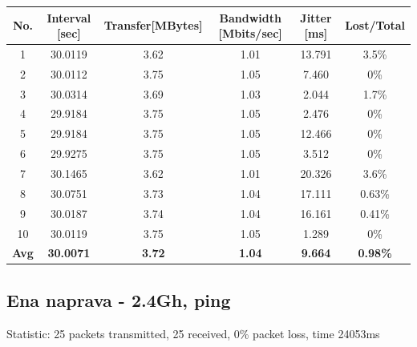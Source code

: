 \documentclass[11pt,a4paper,slovene]{article}
\begin{document}
 \begin{table}[H]
	\begin{adjustwidth}{-3cm}{-3cm}
	\centering
		\begin{tabular}{c|c|c|c|c|c}
		\hline
		\textbf{No.} & \textbf{Interval [sec]} & \textbf{Transfer[MBytes]} & \textbf{Bandwidth [Mbits/sec]} & \textbf{Jitter [ms]} & \textbf{Lost/Total} \\
     		\hline
     		1 & 30.0119 & 3.62 & 1.01 & 13.791 & 3.5\% \\
  		2 & 30.0112 & 3.75 & 1.05 & 7.460 & 0\% \\
  		3 & 30.0314 & 3.69 & 1.03 & 2.044 & 1.7\% \\
  		4 & 29.9184 & 3.75 & 1.05 & 2.476 & 0\% \\
  		5 & 29.9184 & 3.75 & 1.05 & 12.466 & 0\% \\
  		6 & 29.9275 & 3.75 & 1.05 & 3.512 & 0\% \\
  		7 & 30.1465 & 3.62 & 1.01 & 20.326 & 3.6\% \\
  		8 & 30.0751 & 3.73 & 1.04 & 17.111 & 0.63\% \\
  		9 & 30.0187 & 3.74 & 1.04 & 16.161 & 0.41\% \\
  		10 & 30.0119 & 3.75 & 1.05 & 1.289 & 0\% \\
  		\hline
  		\textbf{Avg} & \textbf{30.0071} & \textbf{3.72} & \textbf{1.04} & \textbf{9.664} & \textbf{0.98\%} \\
  		\hline
    		\end{tabular}
    	\end{adjustwidth}
\end{table}

\subsection{Ena naprava - 2.4Gh, ping}

Statistic: 25 packets transmitted, 25 received, 0\% packet loss, time 24053ms
 
\end{document}
